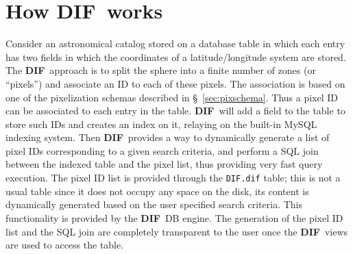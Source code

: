 \documentclass[10pt,titlepage]{article}
\newcommand{\dif}{\textbf{\small DIF}}
\begin{document}
\section{How \dif\ works}
\label{sec:howitworks}
Consider an astronomical catalog stored on a database table in which
each entry has two fields in which the coordinates of a
latitude/longitude system are stored. The \dif\ approach is to split
the sphere into a finite number of zones (or ``pixels'') and associate
an ID to each of these pixels. The association is based on one of the
pixelization schemas described in \S\ \ref{sec:pixschema}. Thus a
pixel ID can be associated to each entry in the table. \dif\ will add a
field to the table to store such IDs and creates an index on it,
relaying on the built-in MySQL indexing system. Then \dif\ provides a
way to dynamically generate a list of pixel IDs corresponding to a
given search criteria, and perform a SQL join between the indexed
table and the pixel list, thus providing very fast query execution.
The pixel ID list is provided through the {\tt DIF.dif} table; this is
not a usual table since it does not occupy any space on the disk, its
content is dynamically generated based on the user specified search
criteria. This functionality is provided by the \dif\ DB engine. The
generation of the pixel ID list and the SQL join are completely
transparent to the user once the \dif\ views are used to access the
table.
%
\end{document}
